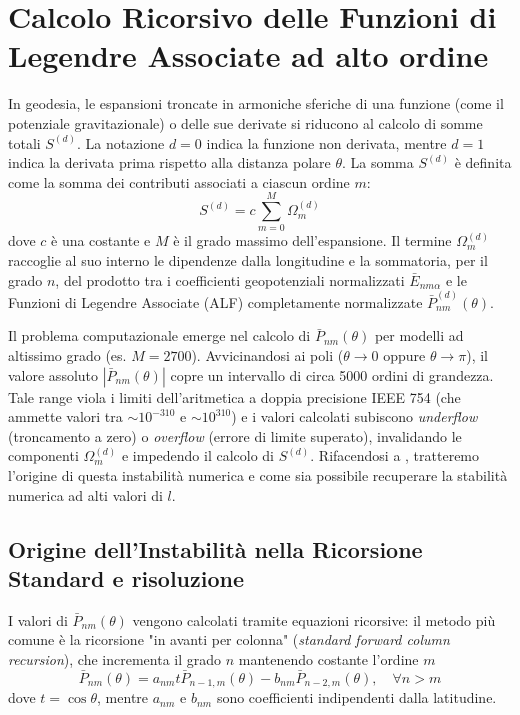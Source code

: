 \chapter{Calcolo Ricorsivo delle Funzioni di Legendre Associate ad alto ordine}

In geodesia, le espansioni troncate in armoniche sferiche di una funzione (come il potenziale gravitazionale) o delle sue derivate si riducono al calcolo di somme totali $S^{(d)}$. La notazione $d=0$ indica la funzione non derivata, mentre $d=1$ indica la derivata prima rispetto alla distanza polare $\theta$. La somma $S^{(d)}$ è definita come la somma dei contributi associati a ciascun ordine $m$:
\begin{equation}
S^{(d)} = c \sum_{m=0}^{M} \Omega_m^{(d)} \label{eq:somma_totale}
\end{equation}
dove $c$ è una costante e $M$ è il grado massimo dell'espansione. Il termine $\Omega_m^{(d)}$ raccoglie al suo interno le dipendenze dalla longitudine e la sommatoria, per il grado $n$, del prodotto tra i coefficienti geopotenziali normalizzati $\bar{E}_{nm\alpha}$ e le Funzioni di Legendre Associate (ALF) completamente normalizzate $\bar{P}_{nm}^{(d)}(\theta)$.

Il problema computazionale emerge nel calcolo di $\bar{P}_{nm}(\theta)$ per modelli ad altissimo grado (es. $M=2700$). Avvicinandosi ai poli ($\theta \rightarrow 0$ oppure $\theta \rightarrow \pi$), il valore assoluto $|\bar{P}_{nm}(\theta)|$ copre un intervallo di circa 5000 ordini di grandezza. Tale range viola i limiti dell'aritmetica a doppia precisione IEEE 754 (che ammette valori tra $\sim 10^{-310}$ e $\sim 10^{310}$) e i valori calcolati subiscono \textit{underflow} (troncamento a zero) o \textit{overflow} (errore di limite superato), invalidando le componenti $\Omega_m^{(d)}$ e impedendo il calcolo di $S^{(d)}$. Rifacendosi a \cite{Holmes2002}, tratteremo l'origine di questa instabilità numerica e come sia possibile recuperare la stabilità numerica ad alti valori di $l$.

\section{Origine dell'Instabilità nella Ricorsione Standard e risoluzione}

I valori di $\bar{P}_{nm}(\theta)$ vengono calcolati tramite equazioni ricorsive: il metodo più comune è la ricorsione "in avanti per colonna" (\textit{standard forward column recursion}), che incrementa il grado $n$ mantenendo costante l'ordine $m$
\begin{equation}
\bar{P}_{nm}(\theta) = a_{nm} t \bar{P}_{n-1,m}(\theta) - b_{nm} \bar{P}_{n-2,m}(\theta), \quad \forall n > m \label{eq:standard_col}
\end{equation}
dove $t = \cos \theta$, mentre $a_{nm}$ e $b_{nm}$ sono coefficienti indipendenti dalla latitudine.

